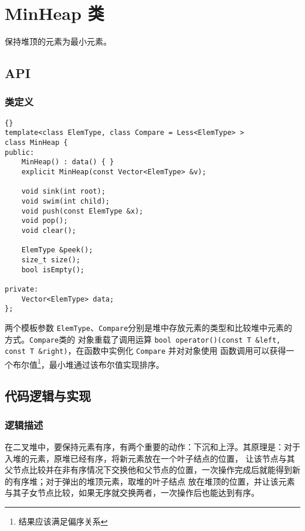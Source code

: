 \chapter{MinHeap 类}

保持堆顶的元素为最小元素。

\section{API}

\subsection{类定义}
{
\begin{lstlisting}[firstnumber=270, caption=MinHeap 类定义]{}
template<class ElemType, class Compare = Less<ElemType> >
class MinHeap {
public:
    MinHeap() : data() { }
    explicit MinHeap(const Vector<ElemType> &v);

    void sink(int root);
    void swim(int child);
    void push(const ElemType &x);
    void pop();
    void clear();

    ElemType &peek();
    size_t size();
    bool isEmpty();

private:
    Vector<ElemType> data;
};
\end{lstlisting}

两个模板参数 \lstinline{ElemType}、\lstinline{Compare}分别是堆中存放元素的类型和比较堆中元素的方式。\lstinline{Compare}类的%
对象重载了调用运算 \lstinline{bool operator()(const T &left, const T &right)}，在函数中实例化 \lstinline{Compare} 并对对象使用%
函数调用可以获得一个布尔值\footnote{结果应该满足偏序关系}，最小堆通过该布尔值实现排序。

\section{代码逻辑与实现}

\subsection{逻辑描述}

在二叉堆中，要保持元素有序，有两个重要的动作：下沉和上浮。其原理是：对于入堆的元素，原堆已经有序，将新元素放在一个叶子结点的位置，%
让该节点与其父节点比较并在非有序情况下交换他和父节点的位置，一次操作完成后就能得到新的有序堆；对于弹出的堆顶元素，取堆的叶子结点%
放在堆顶的位置，并让该元素与其子女节点比较，如果无序就交换两者，一次操作后也能达到有序。

}
